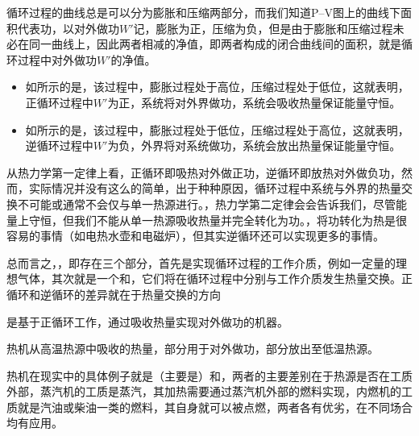 循环过程的曲线总是可以分为膨胀和压缩两部分，而我们知道P--V图上的曲线下面积代表功，以对外做功$W'$记，膨胀为正，压缩为负，但是由于膨胀和压缩过程未必在同一曲线上，因此两者相减的净值，即两者构成的闭合曲线间的面积，就是循环过程中对外做功$W'$的净值。
\begin{itemize}
    \item 如所示的是，该过程中，膨胀过程处于高位，压缩过程处于低位，这就表明，正循环过程中$W'$为正，系统将对外界做功，系统会吸收热量保证能量守恒。
    \item 如所示的是，该过程中，膨胀过程处于低位，压缩过程处于高位，这就表明，逆循环过程中$W'$为负，外界将对系统做功，系统会放出热量保证能量守恒。
\end{itemize}
从热力学第一定律上看，正循环即吸热对外做正功，逆循环即放热对外做负功，然而，实际情况并没有这么的简单，出于种种原因，循环过程中系统与外界的热量交换不可能或通常不会仅与单一热源进行。，热力学第二定律会会告诉我们，尽管能量上守恒，但我们不能从单一热源吸收热量并完全转化为功。，将功转化为热是很容易的事情（如电热水壶和电磁炉），但其实逆循环还可以实现更多的事情。

总而言之，，即存在三个部分，首先是实现循环过程的工作介质，例如一定量的理想气体，其次就是一个和，它们将在循环过程中分别与工作介质发生热量交换。正循环和逆循环的差异就在于热量交换的方向
\begin{OldFigure}[循环过程中的能量流动]
    \begin{OldFigureSub}[热机的工作模式]
    \end{OldFigureSub}
    \begin{OldFigureSub}[热泵的工作模式]
    \end{OldFigureSub}
\end{OldFigure}
\begin{OldBoxDefinition}[热机]
    是基于正循环工作，通过吸收热量实现对外做功的机器。

    热机从高温热源中吸收的热量，部分用于对外做功，部分放出至低温热源。
\end{OldBoxDefinition}
热机在现实中的具体例子就是（主要是）和，两者的主要差别在于热源是否在工质外部，蒸汽机的工质是蒸汽，其加热需要通过蒸汽机外部的燃料实现，内燃机的工质就是汽油或柴油一类的燃料，其自身就可以被点燃，两者各有优劣，在不同场合均有应用。


